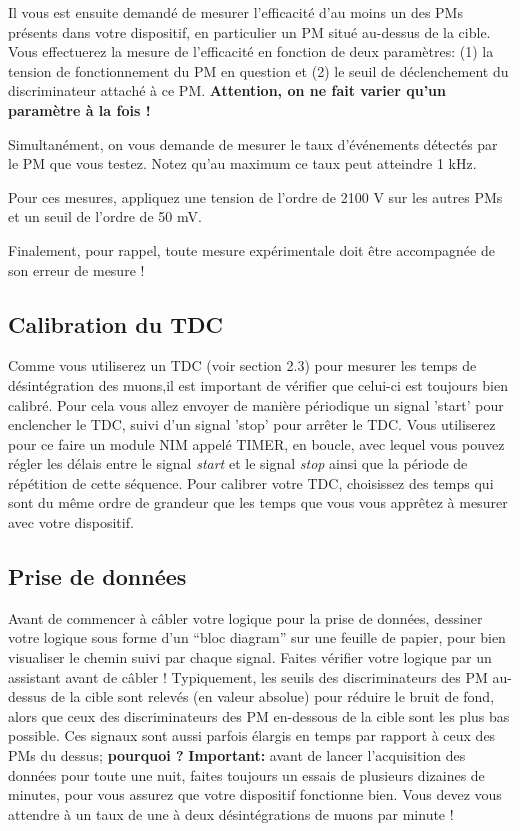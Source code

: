 Il vous est ensuite demandé de mesurer l'efficacité d'au moins un des PMs 
présents dans votre dispositif, en particulier un PM situ\'e au-dessus de la 
cible. Vous effectuerez la mesure de l'efficacité en fonction de deux paramètres: (1) la tension de fonctionnement du PM en question et (2) le seuil de 
déclenchement du discriminateur attaché à ce PM.
\textbf{Attention, on ne fait varier qu'un paramètre à la fois !}

Simultanément, on vous demande de mesurer le taux d'événements détectés par le 
PM que vous testez. Notez qu'au maximum ce taux peut atteindre 1 kHz.

Pour ces mesures, appliquez une tension de l'ordre de 2100 V sur les autres PMs et un seuil de l'ordre de 50 mV.

Finalement, pour rappel, toute mesure expérimentale doit être accompagnée de son erreur de mesure !

\subsection{Calibration du TDC}
Comme vous utiliserez un TDC (voir section 2.3) pour mesurer les temps de désintégration des muons,il est important de vérifier que celui-ci est toujours bien calibré. Pour cela vous 
allez envoyer de manière périodique un signal 'start' pour enclencher le TDC, suivi d'un signal 'stop' pour arrêter le TDC. Vous utiliserez pour ce faire un module NIM appelé TIMER, en boucle, avec lequel vous pouvez régler les délais entre
le signal \textit{start} et le signal \textit{stop} ainsi que la période de répétition de cette séquence.
Pour calibrer votre TDC, choisissez des temps qui sont du même ordre de grandeur 
que les temps que vous vous apprêtez à mesurer avec votre dispositif.

\subsection{Prise de données}
Avant de commencer à câbler votre logique pour la prise de données, dessiner votre logique sous forme d'un ``bloc diagram'' sur une feuille de papier, pour
bien visualiser le chemin suivi par chaque signal. Faites vérifier votre logique
par un assistant avant de câbler !
Typiquement, les seuils des discriminateurs des PM au-dessus de la cible sont relevés (en valeur absolue) pour réduire le bruit de fond, alors que ceux des  
discriminateurs des PM en-dessous de la cible sont les plus bas possible. Ces 
signaux sont aussi parfois élargis en temps par rapport à ceux des PMs du dessus; \textbf{pourquoi ?}
\newline
 \textbf{Important:} avant de lancer l'acquisition des données pour toute une nuit, faites toujours un essais de plusieurs dizaines de minutes, pour vous assurez que
votre dispositif fonctionne bien. Vous devez vous attendre à un taux de une à 
deux désintégrations de muons par minute !

